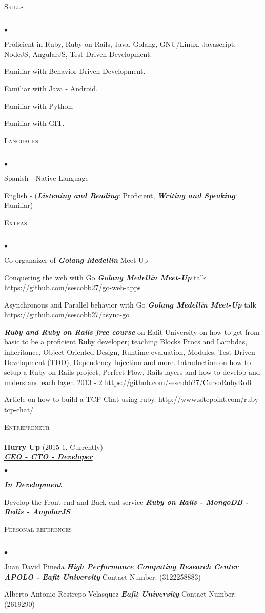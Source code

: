 \documentclass[a4paper]{article}
\newcommand{\lineunder}{\vspace*{-8pt} \\ \hspace*{-18pt} \hrulefill \\}
\newcommand{\header}[1]{{\hspace*{-15pt}\vspace*{6pt}
\textsc{#1}} \vspace*{-6pt} \lineunder}
\newcommand{\employer}[3]{{
\textbf{#1} (#2)\\ \underline{\textbf{\emph{#3}}}\\ }}
\newenvironment{achievements}{\begin{list}{$\bullet$}{\topsep 0pt \itemsep
-2pt}}{\vspace*{4pt}\end{list}}
\newcommand{\emphasys}[1]{\textbf{\emph{#1}}}
\begin{document}
\header{Skills}
\begin{achievements}
\item {Proficient in Ruby, Ruby on Rails, Java, Golang, GNU/Linux, Javascript, NodeJS, AngularJS, Test Driven Development.}
\item {Familiar with Behavior Driven Development.}
\item {Familiar with Java - Android.}
\item {Familiar with Python.}
\item {Familiar with GIT.}
\end{achievements}
\header{Languages}
\begin{achievements}
\item{Spanish - Native Language}
\item{English - (\emphasys{Listening and Reading}: Proficient, \emphasys{Writing and Speaking}: Familiar)}
\end{achievements}

\header{Extras}
\begin{achievements}
\item{Co-organaizer of \emphasys{Golang Medell\'in} Meet-Up}
\item{Conquering the web with Go \emphasys{Golang Medell\'in Meet-Up} talk \url{https://github.com/sescobb27/go-web-apps}}
\item{Asynchronous and Parallel behavior with Go \emphasys{Golang Medell\'in Meet-Up} talk \url{https://github.com/sescobb27/async-go}}
\item{\emphasys{Ruby and Ruby on Rails free course} on Eafit University on how to get from basic to be a proficient Ruby developer; teaching Blocks Procs and Lambdas, inheritance, Object Oriented Design, Runtime evaluation, Modules, Test Driven Development (TDD), Dependency Injection and more. Introduction on how to setup a Ruby on Rails project, Perfect Flow, Rails layers and how to develop and understand each layer. 2013 - 2 \url{https://github.com/sescobb27/CursoRubyRoR}}
\item{Article on how to build a TCP Chat using ruby. \url{http://www.sitepoint.com/ruby-tcp-chat/}}
\end{achievements}

\header{Entrepreneur}
\employer{ Hurry Up} {2015-1, Currently} {CEO - CTO - Developer}
\begin{achievements}
\item {\emphasys{In Development}}
\item {Develop the Front-end and Back-end service \emphasys{Ruby on Rails - MongoDB - Redis - AngularJS}}
\end{achievements}

\header{Personal references}
\begin{achievements}
\item{Juan David Pineda \emphasys{High Performance Computing Research Center APOLO - Eafit University} Contact Number: (3122258883)}
\item{Alberto Antonio Restrepo Velasquez  \emphasys{Eafit University} Contact Number: (2619290)}
\end{achievements}
\end{document}
